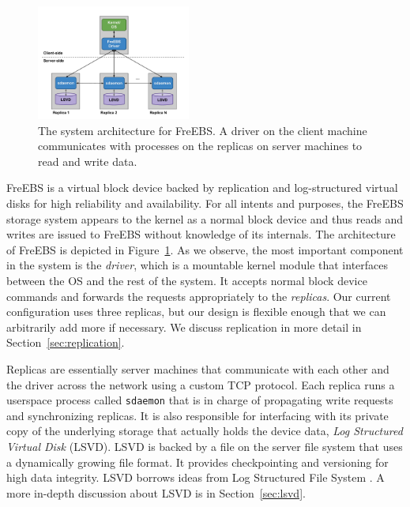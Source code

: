 \begin{figure}[b!]
    \includegraphics[width=0.45\textwidth]{./figures/systemarch.pdf}    
    \caption{The system architecture for FreEBS. A driver on the client 
            machine communicates with processes on the replicas on server 
            machines to read and write data.}
    \label{fig:architecture}
\end{figure}


FreEBS is a virtual block device backed by replication and log-structured
virtual disks for high reliability and availability. For all intents and 
purposes, the FreEBS storage system appears to the kernel as a normal block
device and thus reads and writes are issued to FreEBS without knowledge of 
its internals. The architecture of FreEBS is depicted in 
Figure~\ref{fig:architecture}. As we observe, the most important component in
the system is the \emph{driver}, which is a mountable kernel module that 
interfaces between the OS and the rest of the system. It accepts normal 
block device commands and forwards the requests appropriately to the 
\emph{replicas}. Our current configuration uses three replicas, but our 
design is flexible enough that we can arbitrarily add more if necessary. We 
discuss replication in more detail in Section~\ref{sec:replication}.
 
Replicas are essentially server machines that communicate with each other 
and the driver across the network using a custom TCP protocol. Each replica 
runs a userspace process called \texttt{sdaemon} that is in 
charge of propagating write requests and synchronizing replicas. It is also
responsible for interfacing with its private copy of the underlying storage 
that actually holds the device data, \emph{Log Structured Virtual Disk}
(LSVD). LSVD is backed by a file on the server file system that uses a 
dynamically growing file format. It provides checkpointing and versioning 
for high data integrity. LSVD borrows ideas from Log Structured File System \cite{lfs}. A more in-depth discussion about LSVD is in Section~\ref{sec:lsvd}.


